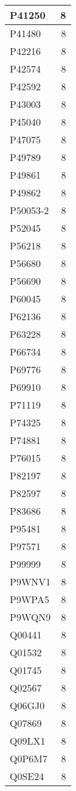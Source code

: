 \documentclass[
]{book}
\theoremstyle{definition}
\theoremstyle{definition}
\theoremstyle{definition}
\theoremstyle{definition}
\theoremstyle{remark}
\begin{document}
\begin{table}
\begin{tabular}{l|r}
\hline
P41250 & 8\\
\hline
P41480 & 8\\
\hline
P42216 & 8\\
\hline
P42574 & 8\\
\hline
P42592 & 8\\
\hline
P43003 & 8\\
\hline
P45040 & 8\\
\hline
P47075 & 8\\
\hline
P49789 & 8\\
\hline
P49861 & 8\\
\hline
P49862 & 8\\
\hline
P50053-2 & 8\\
\hline
P52045 & 8\\
\hline
P56218 & 8\\
\hline
P56680 & 8\\
\hline
P56690 & 8\\
\hline
P60045 & 8\\
\hline
P62136 & 8\\
\hline
P63228 & 8\\
\hline
P66734 & 8\\
\hline
P69776 & 8\\
\hline
P69910 & 8\\
\hline
P71119 & 8\\
\hline
P74325 & 8\\
\hline
P74881 & 8\\
\hline
P76015 & 8\\
\hline
P82197 & 8\\
\hline
P82597 & 8\\
\hline
P83686 & 8\\
\hline
P95481 & 8\\
\hline
P97571 & 8\\
\hline
P99999 & 8\\
\hline
P9WNV1 & 8\\
\hline
P9WPA5 & 8\\
\hline
P9WQN9 & 8\\
\hline
Q00441 & 8\\
\hline
Q01532 & 8\\
\hline
Q01745 & 8\\
\hline
Q02567 & 8\\
\hline
Q06GJ0 & 8\\
\hline
Q07869 & 8\\
\hline
Q09LX1 & 8\\
\hline
Q0P6M7 & 8\\
\hline
Q0SE24 & 8\\

\end{tabular}
\end{table}
\end{document}
